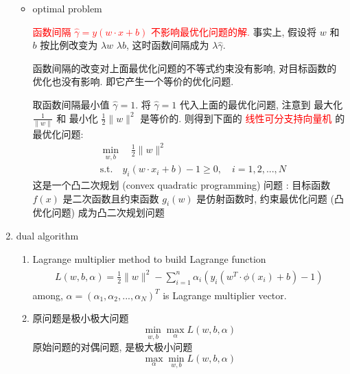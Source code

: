 \documentclass[oneside, 12pt]{ctexbook}
\begin{document}
\begin{enumerate}
\begin{itemize}
							\item optimal problem
							
								\qquad 	\textcolor{red}{函数间隔 $\hat{\gamma} = y (w \cdot x + b)$ 不影响最优化问题的解.}  事实上, 假设将 $w$ 和 $b$ 按比例改变为 $\lambda w$ $\lambda b$, 这时函数间隔成为 $\lambda \hat{\gamma}$.
								
								\qquad 函数间隔的改变对上面最优化问题的不等式约束没有影响, 
								对目标函数的优化也没有影响. 即它产生一个等价的优化问题. 
								
								\qquad	取函数间隔最小值 $\hat{\gamma} = 1$. 将 $\hat{\gamma} = 1$ 代入上面的最优化问题, 注意到 最大化 $\frac{1}{\parallel w \parallel}$ 和 最小化 $\frac{1}{2} \parallel w \parallel ^2$ 是等价的. 则得到下面的 \textcolor{red}{线性可分支持向量机} 的最优化问题:
									\begin{align}
										&\min\limits_{w, b} \quad \frac{1}{2} \parallel w \parallel ^2 \\
										&\text{s.t.} \quad y_i(w \cdot x_i + b) - 1 \geq 0, \quad i=1,2,...,N
									\end{align}
								\qquad 这是一个凸二次规划 (convex quadratic programming) 问题 :
								目标函数 $f(x)$ 是二次函数且约束函数 $g_i(w)$ 是仿射函数时, 约束最优化问题 (凸优化问题) 成为凸二次规划问题
						\end{itemize}
					
					\item dual algorithm
						\begin{enumerate}
							\item Lagrange multiplier method to build Lagrange function
								\begin{align}
									\begin{split}
										L(w, b, \alpha) = \frac{1}{2} \parallel w \parallel ^2 - \sum\limits_{i=1}^{n} \alpha_i (y_i (w^T \cdot \phi(x_i) + b) - 1)
									\end{split} \label{Lagrange_function}
								\end{align}
								among, $\alpha = (\alpha_1, \alpha_2, ..., \alpha_N)^T$ is Lagrange multiplier vector.
								
							\item 原问题是极小极大问题 $$\min\limits_{w,b} \max\limits_{\alpha} L(w, b, \alpha)$$
							原始问题的对偶问题, 是极大极小问题$$\max\limits_{\alpha} \min\limits_{w,b} L(w,b,\alpha)$$
							

\end{enumerate}
\end{enumerate}
\end{document}

